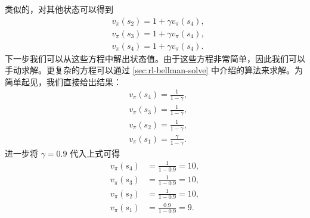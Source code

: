 \begin{example}[确定性策略]
类似的，对其他状态可以得到
\begin{equation*}
\begin{aligned}
& v_\pi(s_2) = 1 + \gamma v_\pi(s_4), \\
& v_\pi(s_3) = 1 + \gamma v_\pi(s_4), \\
& v_\pi(s_4) = 1 + \gamma v_\pi(s_4).
\end{aligned}
\end{equation*}
下一步我们可以从这些方程中解出状态值。由于这些方程非常简单，因此我们可以手动求解。更复杂的方程可以通过 \cref{sec:rl-bellman-solve} 中介绍的算法来求解。为简单起见，我们直接给出结果：
\begin{equation*}
\begin{aligned}
& v_\pi(s_4) = \frac{1}{1 - \gamma}, \\
& v_\pi(s_3) = \frac{1}{1 - \gamma}, \\
& v_\pi(s_2) = \frac{1}{1 - \gamma}, \\
& v_\pi(s_1) = \frac{\gamma}{1 - \gamma}.
\end{aligned}
\end{equation*}
进一步将 $\gamma = 0.9$ 代入上式可得
\begin{align*}
v_\pi(s_4) &= \frac{1}{1 - 0.9} = 10, \\
v_\pi(s_3) &= \frac{1}{1 - 0.9} = 10, \\
v_\pi(s_2) &= \frac{1}{1 - 0.9} = 10, \\
v_\pi(s_1) &= \frac{0.9}{1 - 0.9} = 9.
\end{align*}
\end{example}

